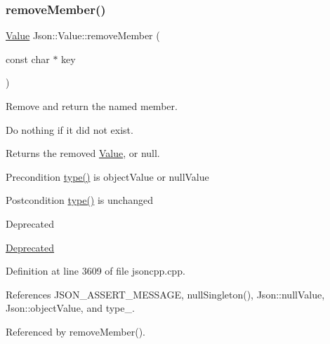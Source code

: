 \subsubsection{\texorpdfstring{remove\+Member()}{removeMember()}\hspace{0.1cm}{\footnotesize\ttfamily [1/5]}}
{\footnotesize\ttfamily \hyperlink{class_json_1_1_value}{Value} Json\+::\+Value\+::remove\+Member (\begin{DoxyParamCaption}\item[{const char $\ast$}]{key }\end{DoxyParamCaption})}



Remove and return the named member. 

Do nothing if it did not exist. \begin{DoxyReturn}{Returns}
the removed \hyperlink{class_json_1_1_value}{Value}, or null. 
\end{DoxyReturn}
\begin{DoxyPrecond}{Precondition}
\hyperlink{class_json_1_1_value_a8ce61157a011894f0252ceed232312de}{type()} is object\+Value or null\+Value 
\end{DoxyPrecond}
\begin{DoxyPostcond}{Postcondition}
\hyperlink{class_json_1_1_value_a8ce61157a011894f0252ceed232312de}{type()} is unchanged 
\end{DoxyPostcond}
\begin{DoxyRefDesc}{Deprecated}
\item[\hyperlink{deprecated__deprecated000001}{Deprecated}]\end{DoxyRefDesc}


Definition at line 3609 of file jsoncpp.\+cpp.



References J\+S\+O\+N\+\_\+\+A\+S\+S\+E\+R\+T\+\_\+\+M\+E\+S\+S\+A\+GE, null\+Singleton(), Json\+::null\+Value, Json\+::object\+Value, and type\+\_\+.



Referenced by remove\+Member().



